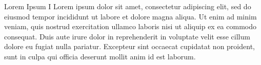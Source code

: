 \begin{titledbox}{Lorem Ipsum I}
    Lorem ipsum dolor sit amet, consectetur adipiscing elit, sed do eiusmod
    tempor incididunt ut labore et dolore magna aliqua. Ut enim ad minim veniam,
    quis nostrud exercitation ullamco laboris nisi ut aliquip ex ea commodo
    consequat. Duis aute irure dolor in reprehenderit in voluptate velit esse
    cillum dolore eu fugiat nulla pariatur. Excepteur sint occaecat cupidatat
    non proident, sunt in culpa qui officia deserunt mollit anim id est laborum.
\end{titledbox}